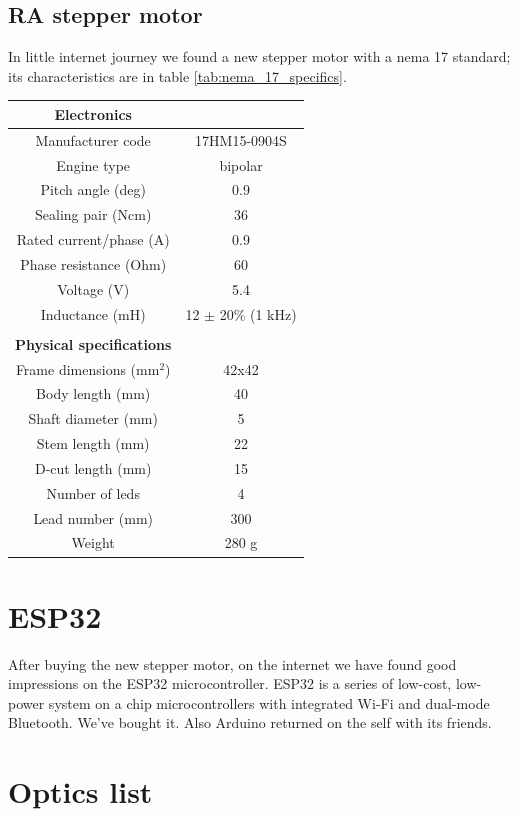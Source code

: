 \documentclass{article}
\begin{document}
\begin{multicols}{2}
        \subsection{RA stepper motor}
        In little internet journey we found a new stepper motor with a nema 17 standard; its characteristics are in table \ref{tab:nema_17_specifics}.
        \begin{minipage}{0.5\textwidth}
            \centering
            \begin{tabular}{cc}
                \textbf{Electronics}&\\
                \hline
                Manufacturer code & 17HM15-0904S\\
                Engine type & bipolar\\
                Pitch angle (deg) & 0.9 \\
                Sealing pair (Ncm)& 36\\
                Rated current/phase (A) & 0.9\\
                Phase resistance (Ohm)& 60\\
                Voltage (V)& 5.4\\
                Inductance (mH)& 12 \(\pm\) 20\% (1 kHz)\\
                &\\
                \textbf{Physical specifications}&\\
                \hline
                Frame dimensions (mm\(^2\))& 42x42 \\
                Body length (mm)& 40 \\
                Shaft diameter (mm)& 5 \\
                Stem length (mm)& 22 \\
                D-cut length (mm)& 15 \\
                Number of leds & 4\\
                Lead number (mm)& 300 \\
                Weight & 280 g\\
                \hline
            \end{tabular}
            \label{tab:nema_17_specifics}
        \end{minipage}

        \section{ESP32}
        After buying the new stepper motor, on the internet we have found good impressions on the ESP32 microcontroller.
        ESP32 is a series of low-cost, low-power system on a chip microcontrollers with integrated Wi-Fi and dual-mode Bluetooth.
        We've bought it. Also Arduino returned on the self with its friends.

        \section{Optics list}

    \end{multicols}
\end{document}
